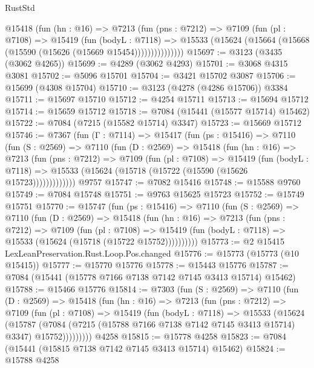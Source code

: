 \begin{lexlean}{RustStd}
\begin{coremodule}
            @15418
              (fun (hn : @16) =>
              @7213
                (fun (pns : @7212) =>
                @7109
                  (fun (pl : @7108) =>
                  @15419
                    (fun (bodyL : @7118) =>
                    @15533 (@15624 (@15664 (@15668 (@15590 (@15626 (@15669 @15454)))))))))))))))
@15697 := @3123 (@3435 (@3062 @4265))
@15699 := @4289 (@3062 @4293)
@15701 := @3068 @4315 @3081
@15702 := @5096 @15701
@15704 := @3421 @15702 @3087
@15706 := @15699 (@4308 @15704)
@15710 := @3123 (@4278 (@4286 @15706)) @3384
@15711 := @15697 @15710
@15712 := @4254 @15711
@15713 := @15694 @15712
@15714 := @15659 @15712
@15718 := @7084 (@15441 (@15577 @15714) @15462)
@15722 := @7084 (@7215 (@15582 @15714) @3347)
@15723 := @15669 @15712
@15746 := @7367
    (fun (Γ : @7114) =>
    @15417
      (fun (ps : @15416) =>
      @7110
        (fun (S : @2569) =>
        @7110
          (fun (D : @2569) =>
          @15418
            (fun (hn : @16) =>
            @7213
              (fun (pns : @7212) =>
              @7109
                (fun (pl : @7108) =>
                @15419
                  (fun (bodyL : @7118) =>
                  @15533 (@15624 (@15718 (@15722 (@15590 (@15626 @15723)))))))))))))
    @9757
@15747 := @7082 @15416
@15748 := @15588 @9760
@15749 := @7084 @15748
@15751 := @9763 @15625 @15723
@15752 := @15749 @15751
@15770 := @15747
    (fun (ps : @15416) =>
    @7110
      (fun (S : @2569) =>
      @7110
        (fun (D : @2569) =>
        @15418
          (fun (hn : @16) =>
          @7213
            (fun (pns : @7212) =>
            @7109
              (fun (pl : @7108) =>
              @15419 (fun (bodyL : @7118) => @15533 (@15624 (@15718 (@15722 @15752))))))))))
@15773 := @2 @15415 LexLeanPreservation.Rust.Loop.Pos.changed
@15776 := @15773 (@15773 (@10 @15415))
@15777 := @15770 @15776
@15778 := @15443 @15776
@15787 := @7084 (@15441 (@15778 @7166 @7138 @7142 @7145 @3413 @15714) @15462)
@15788 := @15466 @15776
@15814 := @7303
    (fun (S : @2569) =>
    @7110
      (fun (D : @2569) =>
      @15418
        (fun (hn : @16) =>
        @7213
          (fun (pns : @7212) =>
          @7109
            (fun (pl : @7108) =>
            @15419
              (fun (bodyL : @7118) =>
              @15533
                (@15624
                  (@15787
                    (@7084
                      (@7215 (@15788 @7166 @7138 @7142 @7145 @3413 @15714) @3347)
                      @15752)))))))))
    @4258
@15815 := @15778 @4258
@15823 := @7084 (@15441 (@15815 @7138 @7142 @7145 @3413 @15714) @15462)
@15824 := @15788 @4258

\end{coremodule}
\end{lexlean}
